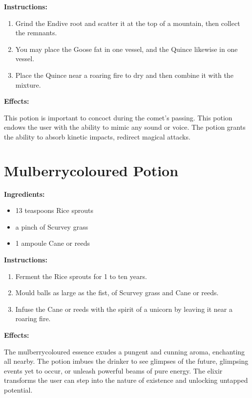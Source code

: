 \documentclass{article}
\begin{document}
\textbf{Instructions:}

\begin{enumerate}
  \item Grind the Endive root and scatter it at the top of a mountain, then collect the remnants.
  \item You may place the Goose fat in one vessel, and the Quince likewise in one vessel.
  \item Place the Quince near a roaring fire to dry and then combine it with the mixture.
\end{enumerate}

\textbf{Effects:}

This potion is important to concoct during the comet’s passing. This potion endows the user with the ability to mimic any sound or voice. The potion grants the ability to absorb kinetic impacts, redirect magical attacks.

\newpage
\section*{Mulberrycoloured Potion}

\textbf{Ingredients:}

\begin{itemize}
  \item 13 teaspoons Rice sprouts
  \item a pinch of Scurvey grass
  \item 1 ampoule Cane or reeds
\end{itemize}

\textbf{Instructions:}

\begin{enumerate}
  \item Ferment the Rice sprouts for 1 to ten years.
  \item Mould balls as large as the fist, of Scurvey grass and Cane or reeds.
  \item Infuse the Cane or reeds with the spirit of a unicorn by leaving it near a roaring fire.
\end{enumerate}

\textbf{Effects:}

The mulberrycoloured essence exudes a pungent and cunning aroma, enchanting all nearby. The potion imbues the drinker to see glimpses of the future, glimpsing events yet to occur, or unleash powerful beams of pure energy. The elixir transforms the user can step into the nature of existence and unlocking untapped potential.
\end{document}
